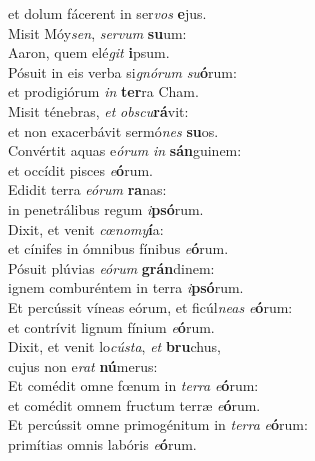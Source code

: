 \evenverse et dolum fácerent in ser\textit{vos} \textbf{e}jus.\\
\oddverse Misit Móy\textit{sen}, \textit{ser}\textit{vum} \textbf{su}um:~\*\\
\oddverse Aaron, quem elé\textit{git} \textbf{i}psum.\\
\evenverse Pósuit in eis verba si\textit{gnó}\textit{rum} \textit{su}\textbf{ó}rum:~\*\\
\evenverse et prodigiórum \textit{in} \textbf{ter}ra Cham.\\
\oddverse Misit ténebras, \textit{et} \textit{ob}\textit{scu}\textbf{rá}vit:~\*\\
\oddverse et non exacerbávit sermó\textit{nes} \textbf{su}os.\\
\evenverse Convértit aquas e\textit{ó}\textit{rum} \textit{in} \textbf{sán}guinem:~\*\\
\evenverse et occídit pisces \textit{e}\textbf{ó}rum.\\
\oddverse Edidit terra \textit{e}\textit{ó}\textit{rum} \textbf{ra}nas:~\*\\
\oddverse in penetrálibus regum \textit{i}\textbf{psó}rum.\\
\evenverse Dixit, et venit \textit{cœ}\textit{no}\textit{my}\textbf{í}a:~\*\\
\evenverse et cínifes in ómnibus fínibus \textit{e}\textbf{ó}rum.\\
\oddverse Pósuit plúvias \textit{e}\textit{ó}\textit{rum} \textbf{grán}dinem:~\*\\
\oddverse ignem comburéntem in terra \textit{i}\textbf{psó}rum.\\
\evenverse Et percússit víneas eórum, et ficúl\textit{ne}\textit{as} \textit{e}\textbf{ó}rum:~\*\\
\evenverse et contrívit lignum fínium \textit{e}\textbf{ó}rum.\\
\oddverse Dixit, et venit lo\textit{cú}\textit{sta}, \textit{et} \textbf{bru}chus,~\*\\
\oddverse cujus non e\textit{rat} \textbf{nú}merus:\\
\evenverse Et comédit omne fœnum in \textit{ter}\textit{ra} \textit{e}\textbf{ó}rum:~\*\\
\evenverse et comédit omnem fructum terræ \textit{e}\textbf{ó}rum.\\
\oddverse Et percússit omne primogénitum in \textit{ter}\textit{ra} \textit{e}\textbf{ó}rum:~\*\\
\oddverse primítias omnis labóris \textit{e}\textbf{ó}rum.\\
